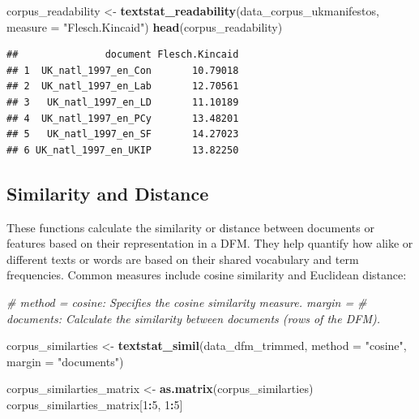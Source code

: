 \documentclass[
]{book}
\newenvironment{Shaded}{\begin{snugshade}}{\end{snugshade}}
\newcommand{\AttributeTok}[1]{\textcolor[rgb]{0.13,0.29,0.53}{#1}}
\newcommand{\CommentTok}[1]{\textcolor[rgb]{0.56,0.35,0.01}{\textit{#1}}}
\newcommand{\DecValTok}[1]{\textcolor[rgb]{0.00,0.00,0.81}{#1}}
\newcommand{\FunctionTok}[1]{\textcolor[rgb]{0.13,0.29,0.53}{\textbf{#1}}}
\newcommand{\NormalTok}[1]{#1}
\newcommand{\OtherTok}[1]{\textcolor[rgb]{0.56,0.35,0.01}{#1}}
\newcommand{\SpecialCharTok}[1]{\textcolor[rgb]{0.81,0.36,0.00}{\textbf{#1}}}
\newcommand{\StringTok}[1]{\textcolor[rgb]{0.31,0.60,0.02}{#1}}
\begin{document}
\begin{Shaded}
\begin{Highlighting}[]
\NormalTok{corpus\_readability }\OtherTok{\textless{}{-}} \FunctionTok{textstat\_readability}\NormalTok{(data\_corpus\_ukmanifestos, }\AttributeTok{measure =} \StringTok{"Flesch.Kincaid"}\NormalTok{)}
\FunctionTok{head}\NormalTok{(corpus\_readability)}
\end{Highlighting}
\end{Shaded}

\begin{verbatim}
##               document Flesch.Kincaid
## 1  UK_natl_1997_en_Con       10.79018
## 2  UK_natl_1997_en_Lab       12.70561
## 3   UK_natl_1997_en_LD       11.10189
## 4  UK_natl_1997_en_PCy       13.48201
## 5   UK_natl_1997_en_SF       14.27023
## 6 UK_natl_1997_en_UKIP       13.82250
\end{verbatim}

\subsection{Similarity and Distance}\label{similarity-and-distance}

These functions calculate the similarity or distance between documents or features based on their representation in a DFM. They help quantify how alike or different texts or words are based on their shared vocabulary and term frequencies. Common measures include cosine similarity and Euclidean distance:

\begin{Shaded}
\begin{Highlighting}[]
\CommentTok{\# method = \textquotesingle{}cosine\textquotesingle{}: Specifies the cosine similarity measure.  margin =}
\CommentTok{\# \textquotesingle{}documents\textquotesingle{}: Calculate the similarity between documents (rows of the DFM).}

\NormalTok{corpus\_similarties }\OtherTok{\textless{}{-}} \FunctionTok{textstat\_simil}\NormalTok{(data\_dfm\_trimmed, }\AttributeTok{method =} \StringTok{"cosine"}\NormalTok{, }\AttributeTok{margin =} \StringTok{"documents"}\NormalTok{)}

\NormalTok{corpus\_similarties\_matrix }\OtherTok{\textless{}{-}} \FunctionTok{as.matrix}\NormalTok{(corpus\_similarties)}
\NormalTok{corpus\_similarties\_matrix[}\DecValTok{1}\SpecialCharTok{:}\DecValTok{5}\NormalTok{, }\DecValTok{1}\SpecialCharTok{:}\DecValTok{5}\NormalTok{]}
\end{Highlighting}
\end{Shaded}
\end{document}
